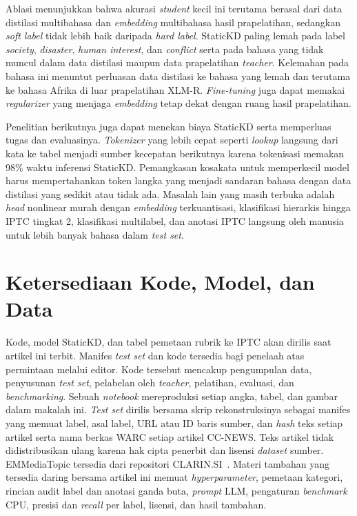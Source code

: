 \documentclass{ieeeaccess}
\newcommand{\en}[1]{\textit{#1}}
\begin{document}
Ablasi menunjukkan bahwa akurasi \en{student} kecil ini terutama berasal dari data distilasi multibahasa dan \en{embedding} multibahasa hasil prapelatihan, sedangkan \en{soft label} tidak lebih baik daripada \en{hard label}. StaticKD paling lemah pada label \emph{society}, \emph{disaster}, \emph{human interest}, dan \emph{conflict} serta pada bahasa yang tidak muncul dalam data distilasi maupun data prapelatihan \en{teacher}. Kelemahan pada bahasa ini menuntut perluasan data distilasi ke bahasa yang lemah dan terutama ke bahasa Afrika di luar prapelatihan XLM-R. \en{Fine-tuning} juga dapat memakai \en{regularizer} yang menjaga \en{embedding} tetap dekat dengan ruang hasil prapelatihan.

Penelitian berikutnya juga dapat menekan biaya StaticKD serta memperluas tugas dan evaluasinya. \en{Tokenizer} yang lebih cepat seperti \en{lookup} langsung dari kata ke tabel menjadi sumber kecepatan berikutnya karena tokenisasi memakan 98\% waktu inferensi StaticKD. Pemangkasan kosakata untuk memperkecil model harus mempertahankan token langka yang menjadi sandaran bahasa dengan data distilasi yang sedikit atau tidak ada. Masalah lain yang masih terbuka adalah \en{head} nonlinear murah dengan \en{embedding} terkuantisasi, klasifikasi hierarkis hingga IPTC tingkat 2, klasifikasi multilabel, dan anotasi IPTC langsung oleh manusia untuk lebih banyak bahasa dalam \en{test set}.

\section*{Ketersediaan Kode, Model, dan Data}
Kode, model StaticKD, dan tabel pemetaan rubrik ke IPTC akan dirilis saat artikel ini terbit. Manifes \en{test set} dan kode tersedia bagi penelaah atas permintaan melalui editor. Kode tersebut mencakup pengumpulan data, penyusunan \en{test set}, pelabelan oleh \en{teacher}, pelatihan, evaluasi, dan \en{benchmarking}. Sebuah \en{notebook} mereproduksi setiap angka, tabel, dan gambar dalam makalah ini. \en{Test set} dirilis bersama skrip rekonstruksinya sebagai manifes yang memuat label, asal label, URL atau ID baris sumber, dan \en{hash} teks setiap artikel serta nama berkas WARC setiap artikel CC-NEWS. Teks artikel tidak didistribusikan ulang karena hak cipta penerbit dan lisensi \en{dataset} sumber. EMMediaTopic tersedia dari repositori CLARIN.SI~\cite{emmediatopic2025}. Materi tambahan yang tersedia daring bersama artikel ini memuat \en{hyperparameter}, pemetaan kategori, rincian audit label dan anotasi ganda buta, \en{prompt} LLM, pengaturan \en{benchmark} CPU, presisi dan \en{recall} per label, lisensi, dan hasil tambahan.
\end{document}
